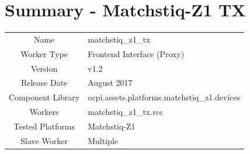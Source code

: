 \documentclass{article}
\author{} %
\date{Version \docVersion} %
\title{\docTitle}
\def\docVersion{1.2}
\def\comp{matchstiq\_z1\_tx}
\def\Comp{Matchstiq-Z1 TX}
\begin{document}
\section*{Summary - \Comp}
\begin{tabular}{|c|M{13.5cm}|}
	\hline
	                  &                                        \\
	\hline
	Name              & \comp                                  \\
	\hline
	Worker Type       & Frontend Interface (Proxy)             \\
	\hline
	Version           & v\docVersion \\
	\hline
	Release Date      & August 2017 \\
	\hline
	Component Library & ocpi.assets.platforms.matchstiq\_z1.devices \\
	\hline
	Workers           & matchstiq\_z1\_tx.rcc                      \\
	\hline
	Tested Platforms  & Matchstiq-Z1                           \\
	\hline
	Slave Worker      & Multiple                               \\
	\hline
\end{tabular}
\end{document}
